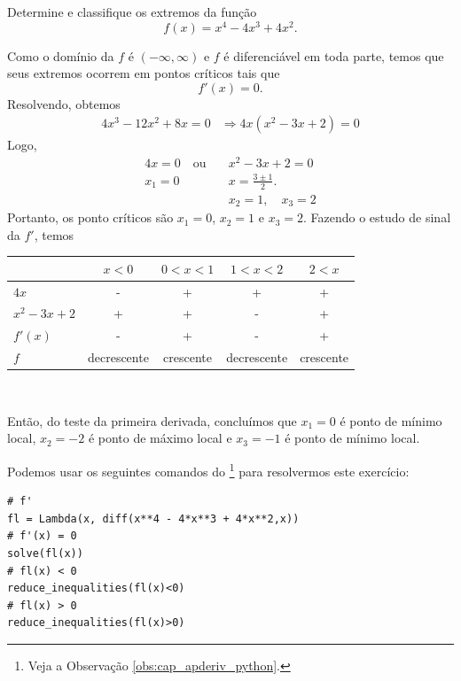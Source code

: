 \begin{exeresol}
  Determine e classifique os extremos da função
  \begin{equation}
    f(x) = x^4 - 4x^3 + 4x^2.
  \end{equation}
\end{exeresol}
\begin{resol}
  Como o domínio da $f$ é $(-\infty, \infty)$ e $f$ é diferenciável em toda parte, temos que seus extremos ocorrem em pontos críticos tais que
  \begin{equation}
    f'(x)=0.
  \end{equation}
  Resolvendo, obtemos
  \begin{align}
    4x^3-12x^2+8x=0 &\Rightarrow 4x(x^2-3x+2)=0
  \end{align}
  Logo,
  \begin{align}
    4x=0 \quad\text{ou}\quad &x^2-3x+2=0\\
    x_1 = 0                  &x = \frac{3\pm 1}{2}. \\
                             &x_2 = 1,\quad x_3=2
  \end{align}
  Portanto, os ponto críticos são $x_1=0$, $x_2=1$ e $x_3=2$. Fazendo o estudo de sinal da $f'$, temos
  \begin{center}
    \begin{tabular}{lcccc}\hline
                 & $x<0$ & $0<x<1$ & $1<x<2$ & $2<x$ \\\hline
      $4x$       & -       &     +       &     +      &   +  \\
      $x^2-3x+2$ & +       &     +       &     -      &   +   \\
      $f'(x)$    & -       &     +       &     -      &   +   \\
      $f$        & decrescente & crescente & decrescente & crescente \\\hline
    \end{tabular}\\
  \end{center}
  Então, do teste da primeira derivada, concluímos que $x_1=0$ é ponto de mínimo local, $x_2=-2$ é ponto de máximo local e $x_3=-1$ é ponto de mínimo local.

  \ifispython
  Podemos usar os seguintes comandos do \sympy\footnote{Veja a Observação \ref{obs:cap_apderiv_python}.} para resolvermos este exercício:
\begin{verbatim}
# f'
fl = Lambda(x, diff(x**4 - 4*x**3 + 4*x**2,x))
# f'(x) = 0
solve(fl(x))
# fl(x) < 0
reduce_inequalities(fl(x)<0)
# fl(x) > 0
reduce_inequalities(fl(x)>0)
\end{verbatim}
  \fi
\end{resol}

